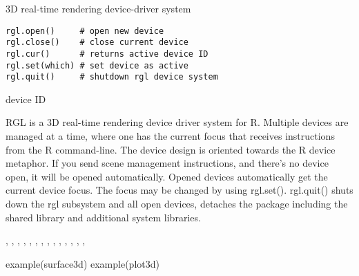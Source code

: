 \documentclass{article}
\begin{document}
\begin{Description}\relax
3D real-time rendering device-driver system
\end{Description}
\begin{Usage}
\begin{verbatim}
rgl.open()     # open new device
rgl.close()    # close current device
rgl.cur()      # returns active device ID
rgl.set(which) # set device as active
rgl.quit()     # shutdown rgl device system
\end{verbatim}
\end{Usage}
\begin{Arguments}
\begin{ldescription}
\item[\code{which}] device ID
\end{ldescription}
\end{Arguments}
\begin{Details}\relax
RGL is a 3D real-time rendering device driver system for R.
Multiple devices are managed at a time, where one has the current focus
that receives instructions from the R command-line.
The device design is oriented towards the R device metaphor. If you send
scene management instructions, and there's no device open, it will be opened
automatically.
Opened devices automatically get the current device focus. The focus may be
changed by using rgl.set().
rgl.quit() shuts down the rgl subsystem and all open devices, 
detaches the package including the shared library and additional system libraries.
\end{Details}
\begin{SeeAlso}\relax
{}, 
,
,
,
,
,
,
,
,
,
,
,
,
,
\end{SeeAlso}
\begin{Examples}
\begin{ExampleCode}
example(surface3d)
example(plot3d)
\end{ExampleCode}
\end{Examples}
\end{document}
